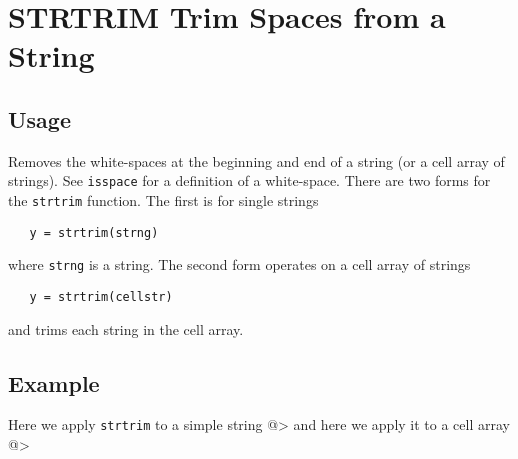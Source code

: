 \section{STRTRIM Trim Spaces from a String}

\subsection{Usage}

Removes the white-spaces at the beginning and end of a string (or a 
cell array of strings). See \verb|isspace| for a definition of a white-space.
There are two forms for the \verb|strtrim| function.  The first is for
single strings
\begin{verbatim}
   y = strtrim(strng)
\end{verbatim}
where \verb|strng| is a string.  The second form operates on a cell array
of strings
\begin{verbatim}
   y = strtrim(cellstr)
\end{verbatim}
and trims each string in the cell array.
\subsection{Example}

Here we apply \verb|strtrim| to a simple string
@>
and here we apply it to a cell array
@>

